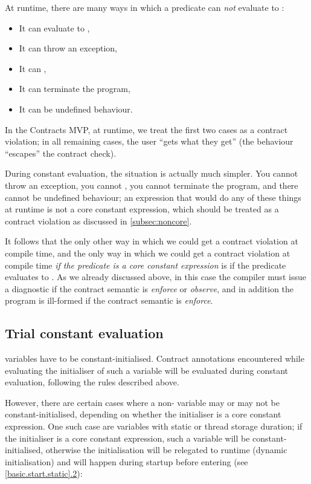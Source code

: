 At runtime, there are many ways in which a predicate can \emph{not} evaluate to :
\begin{itemize}
\item It can evaluate to ,
\item It can throw an exception,
\item It can ,
\item It can terminate the program,
\item It can be undefined behaviour.
\end{itemize}
In the Contracts MVP, at runtime, we treat the first two cases as a contract violation; in all remaining cases, the user ``gets what they get'' (the behaviour ``escapes'' the contract check).

During constant evaluation, the situation is actually much simpler. You cannot throw an exception, you cannot , you cannot terminate the program, and there cannot be undefined behaviour; an expression that would do any of these things at runtime is not a core constant expression, which should be treated as a contract violation as discussed in \ref{subsec:noncore}.

It follows that the only other way in which we could get a contract violation at compile time, and the only way in which we could get a contract violation at compile time \emph{if the predicate is a core constant expression} is if the predicate evaluates to . As we already discussed above, in this case the compiler must issue a diagnostic if the contract semantic is \emph{enforce} or \emph{observe}, and in addition the program is ill-formed if the contract semantic is \emph{enforce}.


\subsection{Trial constant evaluation}
\label{subsec:trial}

 variables have to be constant-initialised. Contract annotations encountered while evaluating the initialiser of such a variable will be evaluated during constant evaluation, following the rules described above.

However, there are certain cases where a non- variable may or may not be constant-initialised, depending on whether the initialiser is a core constant expression. One such case are variables with static or thread storage duration; if the initialiser is a core constant expression, such a variable will be constant-initialised, otherwise the initialisation will be relegated to runtime (dynamic initialisation) and will happen during startup before entering  (see \href{https://eel.is/c++draft/basic.start.static#2.sentence-1}{[basic.start.static].2}):

